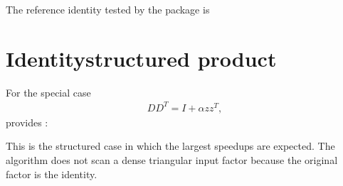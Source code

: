 \documentclass[a4paper,11pt,english]{sphinxmanual}
\begin{document}
\sphinxAtStartPar
The reference identity tested by the package is

\begin{sphinxVerbatim}[commandchars=\\\{\}]
       
  
\end{sphinxVerbatim}


\section{Identity\sphinxhyphen{}structured product}
\label{\detokenize{manual:identity-structured-product}}
\sphinxAtStartPar
For the special case
\begin{equation*}
\begin{split}D D^T = I + \alpha z z^T,\end{split}
\end{equation*}
\sphinxAtStartPar
{} provides :

\begin{sphinxVerbatim}[commandchars=\\\{\}]
     
\end{sphinxVerbatim}

\sphinxAtStartPar
This is the structured case in which the largest speedups are expected.  The
algorithm does not scan a dense triangular input factor because the original
factor is the identity.
\end{document}
